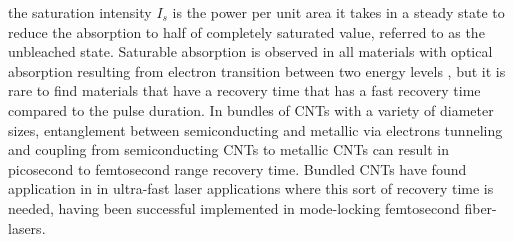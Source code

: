the saturation intensity $I_s$ is the power per unit area it takes in a steady state to reduce the absorption to half of completely saturated value, referred to as the unbleached state. Saturable absorption is observed in all materials with optical absorption resulting from electron transition between two energy levels \cite{thomsen}, but it is rare to find materials that have a recovery time that has a fast recovery time compared to the pulse duration. In bundles of  CNTs  with a variety of diameter sizes, entanglement between semiconducting and metallic via electrons tunneling and coupling from semiconducting CNTs to metallic CNTs \cite{gambetta} can result in picosecond to femtosecond range recovery time. Bundled CNTs have found application in  in ultra-fast laser applications where this sort of recovery time is needed, having been successful implemented in mode-locking femtosecond fiber-lasers\cite{fl1, fl2, fl3, fl4}. 

